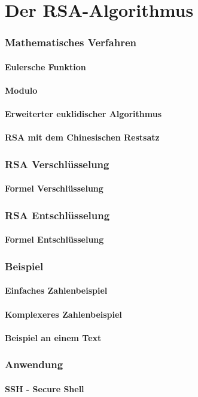 \part{Der RSA-Algorithmus}
\section{Mathematisches Verfahren}
\subsection{Eulersche Funktion}
\subsection{Modulo}
\subsection{Erweiterter euklidischer Algorithmus}
\subsection{RSA mit dem Chinesischen Restsatz}


\section{RSA Verschlüsselung}
\subsection{Formel Verschlüsselung}
\section{RSA Entschlüsselung}
\subsection{Formel Entschlüsselung}
\section{Beispiel}
\subsection{Einfaches Zahlenbeispiel}
\subsection{Komplexeres Zahlenbeispiel}
\subsection{Beispiel an einem Text}
\section{Anwendung}
\subsection{SSH - Secure Shell}
